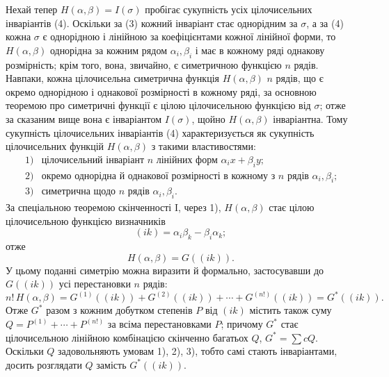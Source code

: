 \documentclass[11pt]{article}
\begin{document}
Нехай тепер \(H(\alpha,\beta)=I(\sigma)\) пробігає сукупність усіх цілочисельних інваріантів (4). Оскільки за (3) кожний інваріант стає однорідним за \(\sigma\), а за (4) кожна \(\sigma\) є однорідною і лінійною за коефіцієнтами кожної лінійної форми, то \(H(\alpha,\beta)\) однорідна за кожним рядом \(\alpha_i,\beta_i\) і має в кожному ряді однакову розмірність; крім того, вона, звичайно, є симетричною функцією \(n\) рядів. Навпаки, кожна цілочисельна симетрична функція \(H(\alpha,\beta)\) \(n\) рядів, що є окремо однорідною і однакової розмірності в кожному ряді, за основною теоремою про симетричні функції є цілою цілочисельною функцією від \(\sigma\); отже за сказаним вище вона є інваріантом \(I(\sigma)\), щойно \(H(\alpha,\beta)\) інваріантна. Тому сукупність цілочисельних інваріантів (4) характеризується як сукупність цілочисельних функцій \(H(\alpha,\beta)\) з такими властивостями:
\[
\begin{array}{ll}
1) & \text{цілочисельний інваріант \(n\) лінійних форм \(\alpha_i x+\beta_i y\);}\\
2) & \text{окремо однорідна й однакової розмірності в кожному з \(n\) рядів \(\alpha_i,\beta_i\);}\\
3) & \text{симетрична щодо \(n\) рядів \(\alpha_i,\beta_i\).}
\end{array}
\]
За спеціальною теоремою скінченності I, через 1), \(H(\alpha,\beta)\) стає цілою цілочисельною функцією визначників
\[
        (ik)=\alpha_i\beta_k-\beta_i\alpha_k;
\]
отже
\[
        H(\alpha,\beta)=G((ik)).
\]
У цьому поданні симетрію можна виразити й формально, застосувавши до \(G((ik))\) усі перестановки \(n\) рядів:
\begin{equation}
        n!\,H(\alpha,\beta)
        =
        G^{(1)}((ik))+G^{(2)}((ik))+\cdots+G^{(n!)}((ik))
        =G^*((ik)).
\end{equation}
Отже \(G^*\) разом з кожним добутком степенів \(P\) від \((ik)\) містить також суму \(Q=P^{(1)}+\cdots+P^{(n!)}\) за всіма перестановками \(P\); причому \(G^*\) стає цілочисельною лінійною комбінацією скінченно багатьох \(Q\), \(G^*=\sum cQ\). Оскільки \(Q\) задовольняють умовам 1), 2), 3), тобто самі стають інваріантами, досить розглядати \(Q\) замість \(G^*((ik))\).
\end{document}
